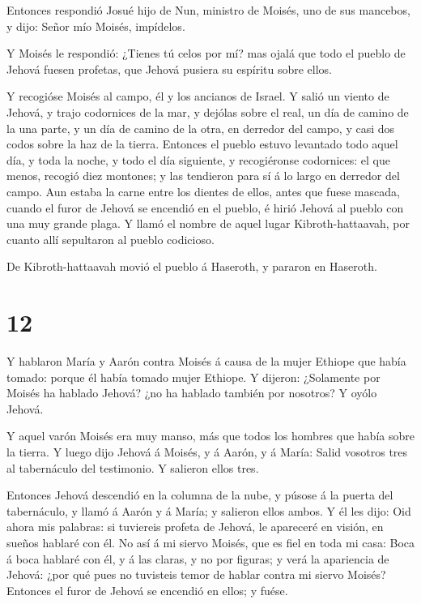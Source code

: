  Entonces respondió Josué hijo de Nun, ministro de Moisés,
uno de sus mancebos, y dijo: Señor mío Moisés, impídelos.

 Y Moisés le respondió: ¿Tienes tú celos por mí? mas ojalá
que todo el pueblo de Jehová fuesen profetas, que Jehová pusiera su
espíritu sobre ellos.

 Y recogióse Moisés al campo, él y los ancianos de Israel.
 Y salió un viento de Jehová, y trajo codornices de la mar,
y dejólas sobre el real, un día de camino de la una parte, y un día de
camino de la otra, en derredor del campo, y casi dos codos sobre la haz
de la tierra.  Entonces el pueblo estuvo levantado todo
aquel día, y toda la noche, y todo el día siguiente, y recogiéronse
codornices: el que menos, recogió diez montones; y las tendieron para sí
á lo largo en derredor del campo.  Aun estaba la carne
entre los dientes de ellos, antes que fuese mascada, cuando el furor de
Jehová se encendió en el pueblo, é hirió Jehová al pueblo con una muy
grande plaga.  Y llamó el nombre de aquel lugar
Kibroth-hattaavah, por cuanto allí sepultaron al pueblo codicioso.

 De Kibroth-hattaavah movió el pueblo á Haseroth, y pararon
en Haseroth.

\hypertarget{section-11}{%
\section{12}\label{section-11}}

 Y hablaron María y Aarón contra Moisés á causa de la mujer
Ethiope que había tomado: porque él había tomado mujer Ethiope.
 Y dijeron: ¿Solamente por Moisés ha hablado Jehová? ¿no ha
hablado también por nosotros? Y oyólo Jehová.

 Y aquel varón Moisés era muy manso, más que todos los
hombres que había sobre la tierra.  Y luego dijo Jehová á
Moisés, y á Aarón, y á María: Salid vosotros tres al tabernáculo del
testimonio. Y salieron ellos tres.

 Entonces Jehová descendió en la columna de la nube, y
púsose á la puerta del tabernáculo, y llamó á Aarón y á María; y
salieron ellos ambos.  Y él les dijo: Oid ahora mis
palabras: si tuviereis profeta de Jehová, le apareceré en visión, en
sueños hablaré con él.  No así á mi siervo Moisés, que es
fiel en toda mi casa:  Boca á boca hablaré con él, y á las
claras, y no por figuras; y verá la apariencia de Jehová: ¿por qué pues
no tuvisteis temor de hablar contra mi siervo Moisés? 
Entonces el furor de Jehová se encendió en ellos; y fuése.

